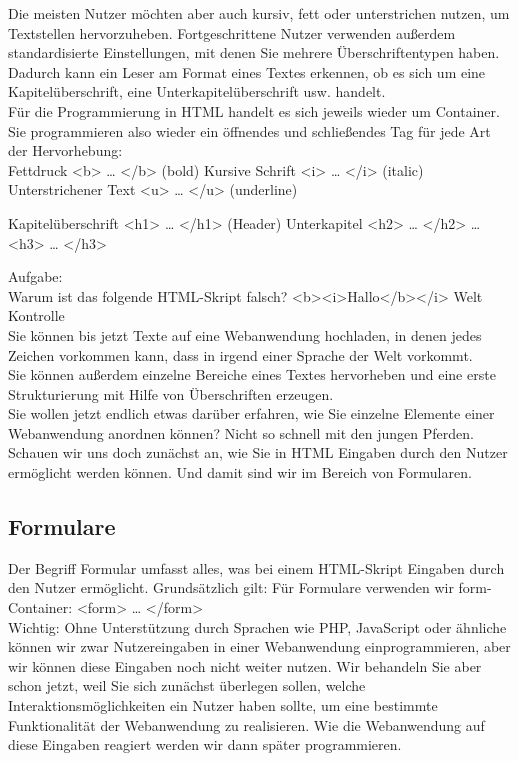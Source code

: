 Die meisten Nutzer möchten aber auch kursiv, fett oder unterstrichen nutzen, um Textstellen hervorzuheben. Fortgeschrittene Nutzer verwenden außerdem standardisierte Einstellungen, mit denen Sie mehrere Überschriftentypen haben. Dadurch kann ein Leser am Format eines Textes erkennen, ob es sich um eine Kapitelüberschrift, eine Unterkapitelüberschrift usw. handelt.\\

Für die Programmierung in HTML handelt es sich jeweils wieder um Container. Sie programmieren also wieder ein öffnendes und schließendes Tag für jede Art der Hervorhebung:\\

Fettdruck	<b> … </b>	(bold)
Kursive Schrift	<i> … </i>	(italic)
Unterstrichener Text	<u> … </u>	(underline)

Kapitelüberschrift	<h1> … </h1>	(Header)
Unterkapitel	<h2> … </h2>	
…	<h3> … </h3>	

Aufgabe: \\

Warum ist das folgende HTML-Skript falsch? <b><i>Hallo</b></i> Welt\\

Kontrolle\\

Sie können bis jetzt Texte auf eine Webanwendung hochladen, in denen jedes Zeichen vorkommen kann, dass in irgend einer Sprache der Welt vorkommt.\\

Sie können außerdem einzelne Bereiche eines Textes hervorheben und eine erste Strukturierung mit Hilfe von Überschriften erzeugen.\\

Sie wollen jetzt endlich etwas darüber erfahren, wie Sie einzelne Elemente einer Webanwendung anordnen können? Nicht so schnell mit den jungen Pferden. Schauen wir uns doch zunächst an, wie Sie in HTML Eingaben durch den Nutzer ermöglicht werden können. Und damit sind wir im Bereich von Formularen.

\subsection{Formulare}

Der Begriff Formular umfasst alles, was bei einem HTML-Skript Eingaben durch den Nutzer ermöglicht. Grundsätzlich gilt: Für Formulare verwenden wir form-Container:
<form> … </form>\\

Wichtig: Ohne Unterstützung durch Sprachen wie PHP, JavaScript oder ähnliche können wir zwar Nutzereingaben in einer Webanwendung einprogrammieren, aber wir können diese Eingaben noch nicht weiter nutzen. Wir behandeln Sie aber schon jetzt, weil Sie sich zunächst überlegen sollen, welche Interaktionsmöglichkeiten ein Nutzer haben sollte, um eine bestimmte Funktionalität der Webanwendung zu realisieren. Wie die Webanwendung auf diese Eingaben reagiert werden wir dann später programmieren.\\

